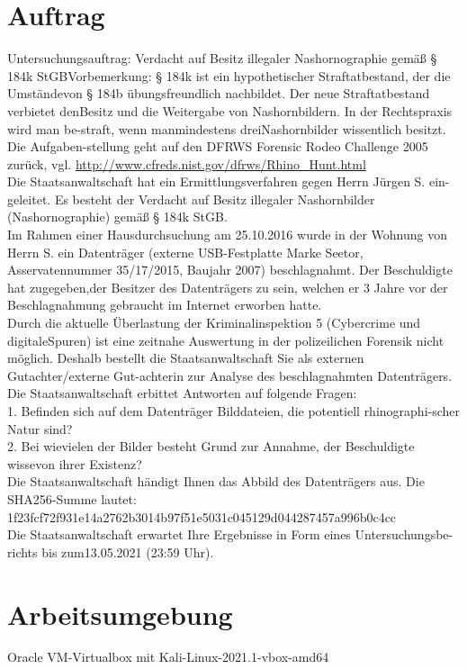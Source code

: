 \section{Auftrag}
Untersuchungsauftrag: Verdacht auf Besitz illegaler Nashornographie gemäß § 184k StGBVorbemerkung: § 184k ist ein hypothetischer Straftatbestand, der die Umständevon § 184b übungsfreundlich nachbildet. Der neue Straftatbestand verbietet denBesitz und die Weitergabe von Nashornbildern. In der Rechtspraxis wird man be-straft, wenn manmindestens dreiNashornbilder wissentlich besitzt. Die Aufgaben-stellung geht auf den DFRWS Forensic Rodeo Challenge 2005 zurück, vgl. \url{http://www.cfreds.nist.gov/dfrws/Rhino_Hunt.html}\\
Die Staatsanwaltschaft hat ein Ermittlungsverfahren gegen Herrn Jürgen S. ein-geleitet. Es besteht der Verdacht auf Besitz illegaler Nashornbilder (Nashornographie) gemäß § 184k StGB.\\
Im Rahmen einer Hausdurchsuchung am 25.10.2016 wurde in der Wohnung von Herrn S. ein Datenträger (externe USB-Festplatte Marke Seetor, Asservatennummer 35/17/2015, Baujahr 2007) beschlagnahmt. Der Beschuldigte hat zugegeben,der Besitzer des Datenträgers zu sein, welchen er 3 Jahre vor der Beschlagnahmung gebraucht im Internet erworben hatte.\\
Durch die aktuelle Überlastung der Kriminalinspektion 5 (Cybercrime und digitaleSpuren) ist eine zeitnahe Auswertung in der polizeilichen Forensik nicht möglich. Deshalb bestellt die Staatsanwaltschaft Sie als externen Gutachter/externe Gut-achterin zur Analyse des beschlagnahmten Datenträgers.\\
Die Staatsanwaltschaft erbittet Antworten auf folgende Fragen:\\
1. Befinden sich auf dem Datenträger Bilddateien, die potentiell rhinographi-scher Natur sind?\\
2. Bei wievielen der Bilder besteht Grund zur Annahme, der Beschuldigte wissevon ihrer Existenz?\\
Die Staatsanwaltschaft händigt Ihnen das Abbild des Datenträgers aus. Die SHA256-Summe lautet:\\ 1f23fcf72f931e14a2762b3014b97f51e5031c045129d044287457a996b0c4cc\\
Die Staatsanwaltschaft erwartet Ihre Ergebnisse in Form eines Untersuchungsbe-richts bis zum13.05.2021 (23:59 Uhr).

\section{Arbeitsumgebung}

Oracle VM-Virtualbox mit Kali-Linux-2021.1-vbox-amd64
